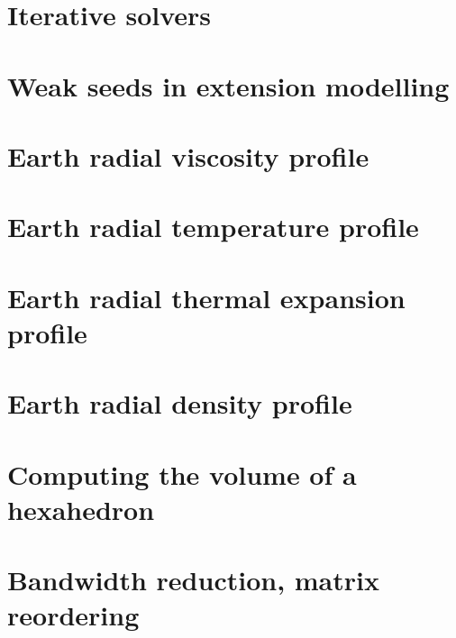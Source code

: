 \section{Iterative solvers \label{ss:itsolvers}}  %
\newpage %
\section{Weak seeds in extension modelling \label{ss:weakseeds}}  %
\newpage %
\section{Earth radial viscosity profile \label{ss:viscprof}}  %
\newpage %
\section{Earth radial temperature profile \label{ss:adiab}}  %
\newpage %
\section{Earth radial thermal expansion profile}  %
\newpage %
\section{Earth radial density profile}  %
\newpage %
\section{Computing the volume of a hexahedron}  %
\newpage %
\section{Bandwidth reduction, matrix reordering}  %
\newpage %
